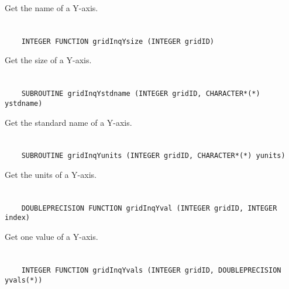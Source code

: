 Get the name of a Y-axis.


\section*{\tt {}}

\begin{verbatim}
    INTEGER FUNCTION gridInqYsize (INTEGER gridID)
\end{verbatim}

Get the size of a Y-axis.


\section*{\tt {}}

\begin{verbatim}
    SUBROUTINE gridInqYstdname (INTEGER gridID, CHARACTER*(*) ystdname)
\end{verbatim}

Get the standard name of a Y-axis.


\section*{\tt {}}

\begin{verbatim}
    SUBROUTINE gridInqYunits (INTEGER gridID, CHARACTER*(*) yunits)
\end{verbatim}

Get the units of a Y-axis.


\section*{\tt {}}

\begin{verbatim}
    DOUBLEPRECISION FUNCTION gridInqYval (INTEGER gridID, INTEGER index)
\end{verbatim}

Get one value of a Y-axis.


\section*{\tt {}}

\begin{verbatim}
    INTEGER FUNCTION gridInqYvals (INTEGER gridID, DOUBLEPRECISION yvals(*))
\end{verbatim}


